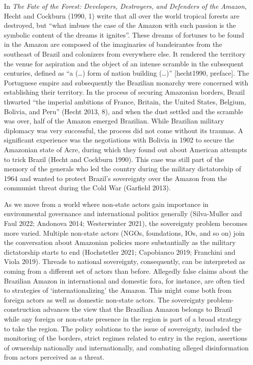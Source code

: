 \documentclass[
]{article}
\begin{document}
In \emph{The Fate of the Forest: Developers, Destroyers, and Defenders
of the Amazon}, Hecht and Cockburn (1990, 1) write that all over the
world tropical forests are destroyed, but ``what imbues the case of the
Amazon with such passion is the symbolic content of the dreams it
ignites''. These dreams of fortunes to be found in the Amazon are
composed of the imaginaries of bandeirantes from the southeast of Brazil
and colonizers from everywhere else. It rendered the territory the venue
for aspiration and the object of an intense scramble in the subsequent
centuries, defined as ``a (\ldots) form of nation building (\ldots)''
{[}hecht1990, preface{]}. The Portuguese empire and subsequently the
Brazilian monarchy were concerned with establishing their territory. In
the process of securing Amazonian borders, Brazil thwarted ``the
imperial ambitions of France, Britain, the United States, Belgium,
Bolivia, and Peru'' (Hecht 2013, 8), and when the dust settled and the
scramble was over, half of the Amazon emerged Brazilian. While Brazilian
military diplomacy was very successful, the process did not come without
its traumas. A significant experience was the negotiations with Bolivia
in 1902 to secure the Amazonian state of Acre, during which they found
out about American attempts to trick Brazil (Hecht and Cockburn 1990).
This case was still part of the memory of the generals who led the
country during the military dictatorship of 1964 and wanted to protect
Brazil's sovereignty over the Amazon from the communist threat during
the Cold War (Garfield 2013).

As we move from a world where non-state actors gain importance in
environmental governance and international politics generally
(Silva-Muller and Faul 2022; Andonova 2014; Westerwinter 2021), the
sovereignty problem becomes more varied. Multiple non-state actors
(NGOs, foundations, IOs, and so on) join the conversation about
Amazonian policies more substantially as the military dictatorship
starts to end (Hochstetler 2021; Capobianco 2019; Franchini and Viola
2019). Threads to national sovereignty, consequently, can be interpreted
as coming from a different set of actors than before. Allegedly false
claims about the Brazilian Amazon in international and domestic fora,
for instance, are often tied to strategies of `internationalizing' the
Amazon. This might come both from foreign actors as well as domestic
non-state actors. The sovereignty problem-construction advances the view
that the Brazilian Amazon belongs to Brazil while any foreign or
non-state presence in the region is part of a broad strategy to take the
region. The policy solutions to the issue of sovereignty, included the
monitoring of the borders, strict regimes related to entry in the
region, assertions of ownership nationally and internationally, and
combating alleged disinformation from actors perceived as a threat.
\end{document}
